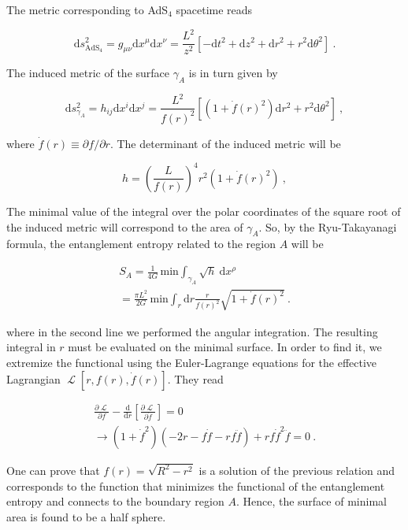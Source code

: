 \documentclass[twocolumn]{revtex4}
\providecommand{\eq}[2]{
    \begin{equation}
        #2
    \label{eq:#1}
    \end{equation}
}
\providecommand{\eqgat}[2]{
    \begin{gather}
        #2
    \label{eq:#1}
    \end{gather}
}
\DeclareMathOperator{\calL}{\mathcal{L}}
\begin{document}
The metric corresponding to AdS$_4$ spacetime reads
\eq{1Ametric}{
    \mathrm{d}s^2_{\text{AdS}_4} = g_{\mu \nu} \mathrm{d}x^\mu \mathrm{d}x^\nu = 
    \frac{L^2}{z^2} [ -\mathrm{d}t^2 + \mathrm{d}z^2 + \mathrm{d}r^2 + r^2 \mathrm{d}\theta^2 ] \ . \nonumber
}
The induced metric of the surface $\gamma_A$ is in turn given by
\eq{1gammaAmetric}{
    \mathrm{d}s^2_{\gamma_A} = h_{i j} \mathrm{d}x^i \mathrm{d}x^j = 
    \frac{L^2}{f(r)^2} \left[ \left( 1+ \dot{f}(r)^2 \right) \mathrm{d}r^2 + r^2 \mathrm{d}\theta^2 \right] \ , \nonumber
}
where $ \dot{f}(r) \equiv \partial f/\partial r$. The determinant of the induced metric will be
\eq{1h}{
    h = \left( \frac{L}{f(r)} \right) ^4 r^2 ( 1 + \dot{f}(r)^2 ) \ , \nonumber
}
The minimal value of the integral over the polar coordinates of the square root of the induced metric will correspond to the area of $\gamma_A$. So, by the Ryu-Takayanagi formula, the entanglement entropy related to the region $A$ will be
\eqgat{1EEA}{
    S_A = \frac{1}{4G} \, \text{min} \int_{\gamma_A} \sqrt{h} \ \mathrm{d}x^\rho \nonumber \\
    = \frac{\pi L^2}{2G} \, \text{min} \int_r \mathrm{d}r \frac{r}{f(r)^2} \sqrt{ 1 + \dot{f}(r)^2 } \ .\nonumber
}
where in the second line we performed the angular integration. The resulting integral in $r$ must be evaluated on the minimal surface. In order to find it, we extremize the functional using the 
Euler-Lagrange equations for the effective Lagrangian $\calL [r,f(r),\dot{f}(r)]$. They read
\eqgat{1EL}{
    \frac{\partial \calL}{\partial f} - \frac{\mathrm{d}}{\mathrm{d}r} \left[ \frac{\partial \calL}{\partial \dot{f}} \right] = 0 \nonumber \\
    \longrightarrow \left( 1+\dot{f}^2 \right) \left( -2r-f\dot{f}-rf\ddot{f} \right) + rf\dot{f}^2\ddot{f} = 0 \ .\nonumber
}
One can prove that $f(r) = \sqrt{R^2 - r^2}$ is a solution of the previous relation and corresponds to the function that minimizes the functional of the entanglement entropy and connects to the boundary region $A$. Hence, the surface of minimal area is found to be a half sphere.
\end{document}
